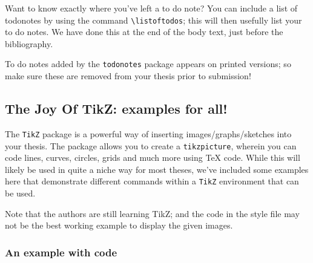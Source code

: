 Want to know exactly where you've left a to do note? You can include a list of todonotes by using the command \verb|\listoftodos|; this will then usefully list your to do notes. We have done this at the end of the body text, just before the bibliography.

\begin{remark} To do notes added by the \verb|todonotes| package appears on printed versions; so make sure these are removed from your thesis prior to submission!
\end{remark}

\subsection{The Joy Of TikZ: examples for all!}
The \verb|TikZ| package is a powerful way of inserting images/graphs/sketches into your thesis. The package allows you to create a \verb|tikzpicture|, wherein you can code lines, curves, circles, grids and much more using \TeX{} code. While this will likely be used in quite a niche way for most theses, we've included some examples here that demonstrate different commands within a \verb|TikZ| environment that can be used.

Note that the authors are still learning TikZ; and the code in the style file may not be the best working example to display the given images.

\subsubsection{An example with code}

